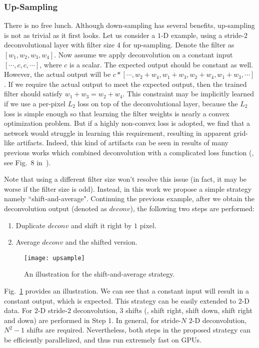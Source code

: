 \documentclass[10pt,twocolumn,letterpaper]{article}
\begin{document}
\subsubsection{Up-Sampling}
There is no free lunch. Although down-sampling has several benefits, up-sampling is not as trivial as it first looks. Let us consider a $1$-D example, using a stride-$2$ deconvolutional layer with filter size $4$ for up-sampling. Denote the filter as $\left[w_1, w_2, w_3, w_4\right]$. Now assume we apply deconvolution on a constant input $\left[\cdots, c, c, \cdots\right]$, where $c$ is a scalar. The expected output should be constant as well. However, the actual output will be $c*\left[\cdots, w_2+w_4, w_1+w_3, w_2+w_4, w_1+w_3, \cdots\right]$. If we require the actual output to meet the expected output, then the trained filter should satisfy $w_1+w_3 = w_2+w_4$. This constraint may be implicitly learned if we use a per-pixel $L_2$ loss on top of the deconvolutional layer, because the $L_2$ loss is simple enough so that learning the filter weights is nearly a convex optimization problem. But if a highly non-convex loss is adopted, we find that a network would struggle in learning this requirement, resulting in apparent grid-like artifacts. Indeed, this kind of artifacts can be seen in results of many previous works which combined deconvolution with a complicated loss function (\eg, see Fig.~8 in~\cite{perceptual_losses}).

Note that using a different filter size won't resolve this issue (in fact, it may be worse if the filter size is odd). Instead, in this work we propose a simple strategy namely ``shift-and-average". Continuing the previous example, after we obtain the deconvolution output (denoted as $deconv$), the following two steps are performed:
\begin{enumerate}
\vspace{-0.5em}
\setlength{\itemsep}{-0.5\itemsep}
\item Duplicate $deconv$ and shift it right by $1$ pixel.
\item Average $deconv$ and the shifted version.
\vspace{-0.5em}
\end{enumerate}
\begin{figure}[t]
\centering
\texttt{[image: upsample]}
\vspace{-0.5em}
\caption{An illustration for the shift-and-average strategy.}
\vspace{-1em}
\label{fig:upsample}
\end{figure}
Fig.~\ref{fig:upsample} provides an illustration. We can see that a constant input will result in a constant output, which is expected. This strategy can be easily extended to $2$-D data. For $2$-D stride-$2$ deconvolution, $3$ shifts (\ie, shift right, shift down, shift right and down) are performed in Step 1. In general, for stride-$N$ $2$-D deconvolution, $N^2-1$ shifts are required. Nevertheless, both steps in the proposed strategy can be efficiently parallelized, and thus run extremely fast on GPUs.
\end{document}
